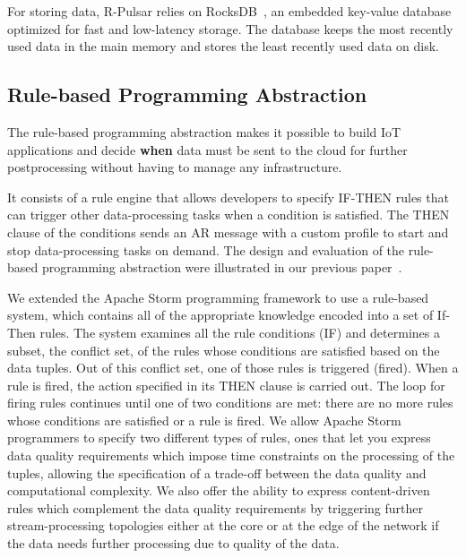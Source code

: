 For storing data, R-Pulsar relies on RocksDB~\cite{rocks}, an embedded key-value database optimized for fast and low-latency storage. The database keeps the most recently used data in the main memory and stores the least recently used data on disk.

\subsection{Rule-based Programming Abstraction}\label{sec:programming-data}
The rule-based programming abstraction makes it possible to build IoT applications and decide \textbf{when} data must be sent to the cloud for further postprocessing without having to manage any infrastructure.

It consists of a rule engine that allows developers to specify IF-THEN rules that can trigger other data-processing tasks when a condition is satisfied. The THEN clause of the conditions sends an AR message with a custom profile to start and stop data-processing tasks on demand. The design and evaluation of the rule-based programming abstraction were illustrated in our previous paper~\cite{rules}.

We extended the Apache Storm programming framework to use a rule-based system, which contains all of the appropriate knowledge encoded into a set of If-Then rules. The system examines all the rule conditions (IF) and determines a subset, the conflict set, of the rules whose conditions are satisfied based on the data tuples. Out of this conflict set, one of those rules is triggered (fired). When a rule is fired, the action specified in its THEN clause is carried out. The loop for firing rules continues until one of two conditions are met: there are no more rules whose conditions are satisfied or a rule is fired. We allow Apache Storm programmers to specify two different types of rules, ones that let you express data quality requirements which impose time constraints on the processing of the tuples, allowing the specification of a trade-off between the data quality and computational complexity. We also offer the ability to express content-driven rules which complement the data quality requirements by triggering further stream-processing topologies either at the core or at the edge of the network if the data needs further processing due to quality of the data.

